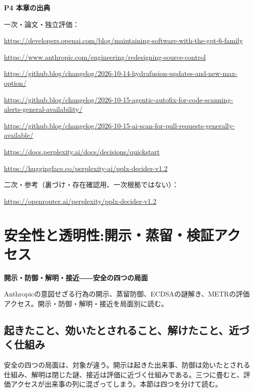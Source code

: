 \documentclass[lualatex,a4paper,10pt]{jlreq}
\begin{document}
\begin{tcolorbox}[colback=white,colframe=SurveyRule,arc=1mm,boxrule=0.4pt,left=2mm,right=2mm]
\textbf{P4 本章の出典}\par\footnotesize
一次・論文・独立評価：\par
[B31] \url{https://developers.openai.com/blog/maintaining-software-with-the-gpt-6-family}\par
[B32] \url{https://www.anthropic.com/engineering/redesigning-source-control}\par
[B33] \url{https://github.blog/changelog/2026-10-14-hydrafusion-updates-and-new-max-option/}\par
[B34] \url{https://github.blog/changelog/2026-10-15-agentic-autofix-for-code-scanning-alerts-general-availability/}\par
[B35] \url{https://github.blog/changelog/2026-10-15-ai-scan-for-pull-requests-generally-available/}\par
[B36] \url{https://docs.perplexity.ai/docs/decisions/quickstart}\par
[B37] \url{https://huggingface.co/perplexity-ai/pplx-decider-v1.2}\par
二次・参考（裏づけ・存在確認用、一次根拠ではない）：\par
[B38] \url{https://openrouter.ai/perplexity/pplx-decider-v1.2}\par
\end{tcolorbox}

\section{安全性と透明性:開示・蒸留・検証アクセス}
\label{sec:P5}

{\Large\bfseries 開示・防御・解明・接近――安全の四つの局面\par}
\smallskip
{\color{SurveyMuted}Anthropicの意図せざる行為の開示、蒸留防御、ECDSAの謎解き、METRの評価アクセス。開示・防御・解明・接近を局面別に読む。\par}
\bigskip

\subsection*{起きたこと、効いたとされること、解けたこと、近づく仕組み}

安全の四つの局面は、対象が違う。開示は起きた出来事、防御は効いたとされる仕組み、解明は閉じた謎、接近は評価に近づく仕組みである。三つに畳むと、評価アクセスが出来事の列に混ざってしまう。本節は四つを分けて読む。
\cite{B39,B40,B41,B42}
\end{document}
